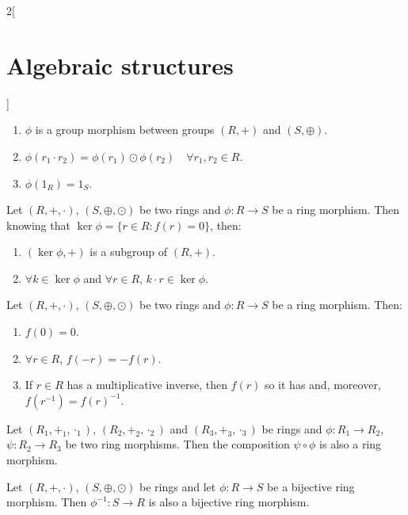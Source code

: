 \documentclass[../../../main.tex]{subfiles}
\begin{document}
\begin{multicols}{2}[\section{Algebraic structures}]
\begin{definition}
\begin{enumerate}
        \item $\phi$ is a group morphism between groups $(R,+)$ and $(S,\oplus)$.
        \item $\phi(r_1\cdot r_2)=\phi(r_1)\odot\phi(r_2)\quad\forall r_1,r_2\in R$.
        \item $\phi(1_R)=1_S$.
    \end{enumerate}
\end{definition}
\begin{lemma}
    Let $(R,+,\cdot)$, $(S,\oplus,\odot)$ be two rings and $\phi:R\rightarrow S$ be a ring morphism. Then knowing that $\ker\phi=\{r\in R:f(r)=0\}$, then:
    \begin{enumerate}
        \item $(\ker\phi,+)$ is a subgroup of $(R,+)$.
        \item $\forall k\in\ker\phi$ and $\forall r\in R$, $k\cdot r\in\ker\phi$.
    \end{enumerate}
\end{lemma}
\begin{prop}
    Let $(R,+,\cdot)$, $(S,\oplus,\odot)$ be two rings and $\phi:R\rightarrow S$ be a ring morphism. Then:
    \begin{enumerate}
        \item $f(0)=0$.
        \item $\forall r\in R$, $f(-r)=-f(r)$.
        \item If $r\in R$ has a multiplicative inverse, then $f(r)$ so it has and, moreover, $f(r^{-1})=f(r)^{-1}$.
    \end{enumerate}
\end{prop}
\begin{prop}
    Let $(R_1,+_1,\cdot_1)$, $(R_2,+_2,\cdot_2)$ and $(R_3,+_3,\cdot_3)$ be rings and $\phi:R_1\rightarrow R_2$, $\psi:R_2\rightarrow R_3$ be two ring morphisms. Then the composition $\psi\circ\phi$ is also a ring morphism.
\end{prop}
\begin{prop}
    Let $(R,+,\cdot)$, $(S,\oplus,\odot)$ be rings and let $\phi: R\rightarrow S$ be a bijective ring morphism. Then $\phi^{-1}: S\rightarrow R$ is also a bijective ring morphism.
\end{prop}

\end{multicols}
\end{document}
